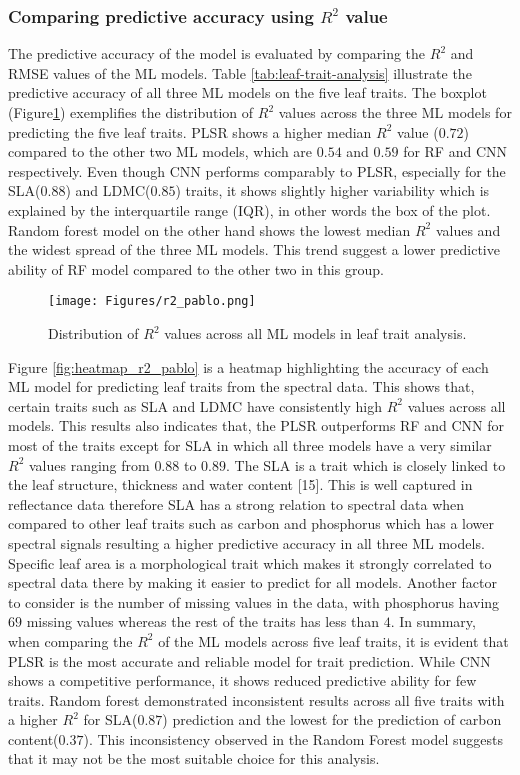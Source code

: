 \documentclass[12pt,a4paper]{report}
\begin{document}
\subsubsection*{Comparing predictive accuracy using $R^2$ value}
The predictive accuracy of the model is evaluated by comparing the $R^2$ and RMSE values of the ML models. Table \ref{tab:leaf-trait-analysis} illustrate the predictive accuracy of all three ML models on the five leaf traits. The boxplot (Figure\ref{fig:r2_pablo}) exemplifies the distribution of $R^2$ values across the three ML models for predicting the five leaf traits. PLSR shows a higher median $R^2$ value ($0.72$) compared to the other two ML models, which are $0.54$ and $0.59$ for RF and CNN respectively. Even though CNN performs comparably to PLSR, especially for the SLA($0.88$) and LDMC($0.85$) traits, it shows slightly higher variability which is explained by the interquartile range (IQR), in other words the box of the plot. Random forest model on the other hand shows the lowest median $R^2$ values and the widest spread of the three ML models. This trend suggest a lower predictive ability of RF model compared to the other two in this group. \\

\begin{figure}[h]
    \centering
    \texttt{[image: Figures/r2\_pablo.png]}
    \caption{Distribution of $R^2$ values across all ML models in leaf trait analysis. }
    \label{fig:r2_pablo}
\end{figure}

Figure \ref{fig:heatmap_r2_pablo} is a heatmap highlighting the accuracy of each ML model for predicting leaf traits from the spectral data. This shows that, certain traits such as SLA and LDMC have consistently high $R^2$ values across all models.  This results also indicates that, the PLSR outperforms RF and CNN for most of the traits except for SLA in which all three models have a very similar $R^2$ values ranging from $0.88$ to $0.89$. The SLA is a trait which is closely linked to the leaf structure, thickness and water content [15]. This is well captured in reflectance data therefore SLA has a strong relation to spectral data when compared to other leaf traits such as carbon and phosphorus which has a lower spectral signals resulting a higher predictive accuracy in all three ML models. Specific leaf area is a morphological trait which makes it strongly correlated to spectral data there by making it easier to predict for all models. Another factor to consider is the number of missing values in the data, with phosphorus having $69$ missing values whereas the rest of the traits has less than $4$. In summary, when comparing the $R^2$ of the ML models across five leaf traits, it is evident that PLSR is the most accurate and reliable model for trait prediction. While CNN shows a competitive performance, it shows reduced predictive ability for few traits. Random forest demonstrated inconsistent results across all five traits with a higher $R^2$ for SLA($0.87$) prediction and the lowest for the prediction of carbon content($0.37$). This inconsistency observed in the Random Forest model suggests that it may not be the most suitable choice for this analysis. \\
\end{document}
